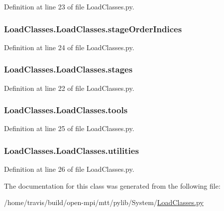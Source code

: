 Definition at line 23 of file Load\-Classes.\-py.

\hypertarget{classLoadClasses_1_1LoadClasses_adb9a18af5fe6814c0c46e8c51f9682ef}{
\subsubsection[{stage\-Order\-Indices}]{\setlength{\rightskip}{0pt plus 5cm}Load\-Classes.\-Load\-Classes.\-stage\-Order\-Indices}}\label{classLoadClasses_1_1LoadClasses_adb9a18af5fe6814c0c46e8c51f9682ef}


Definition at line 24 of file Load\-Classes.\-py.

\hypertarget{classLoadClasses_1_1LoadClasses_aca4663cc6002ec1139e8b07f15aa1006}{
\subsubsection[{stages}]{\setlength{\rightskip}{0pt plus 5cm}Load\-Classes.\-Load\-Classes.\-stages}}\label{classLoadClasses_1_1LoadClasses_aca4663cc6002ec1139e8b07f15aa1006}


Definition at line 22 of file Load\-Classes.\-py.

\hypertarget{classLoadClasses_1_1LoadClasses_acea1357ee5b059c0c010c62d9dcdfd42}{
\subsubsection[{tools}]{\setlength{\rightskip}{0pt plus 5cm}Load\-Classes.\-Load\-Classes.\-tools}}\label{classLoadClasses_1_1LoadClasses_acea1357ee5b059c0c010c62d9dcdfd42}


Definition at line 25 of file Load\-Classes.\-py.

\hypertarget{classLoadClasses_1_1LoadClasses_a9bc5a2e86aee8dffd444ea68bc9258de}{
\subsubsection[{utilities}]{\setlength{\rightskip}{0pt plus 5cm}Load\-Classes.\-Load\-Classes.\-utilities}}\label{classLoadClasses_1_1LoadClasses_a9bc5a2e86aee8dffd444ea68bc9258de}


Definition at line 26 of file Load\-Classes.\-py.



The documentation for this class was generated from the following file\-:\begin{DoxyCompactItemize}
\item 
/home/travis/build/open-\/mpi/mtt/pylib/\-System/\hyperlink{LoadClasses_8py}{Load\-Classes.\-py}\end{DoxyCompactItemize}
